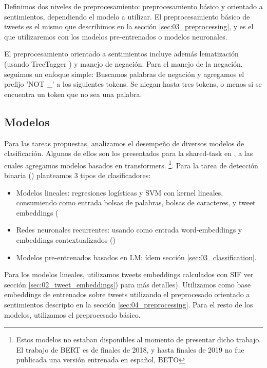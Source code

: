 Definimos dos niveles de preprocesamiento: preprocesamiento básico y orientado a sentimientos, dependiendo el modelo a utilizar. El preprocesamiento básico de tweets es el mismo que describimos en la sección \ref{sec:03_preprocessing}, y es el que utilizaremos con los modelos pre-entrenados o modelos neuronales.

El preprocesamiento orientado a sentimientos incluye además lematización (usando TreeTagger \cite{schmid95}) y manejo de negación.
Para el manejo de la negación, seguimos un enfoque simple:
Buscamos palabras de negación y agregamos el prefijo 'NOT \_' a los siguientes tokens. Se niegan hasta tres tokens, o menos si se encuentra un token que no sea una palabra.

\subsection{Modelos}

Para las tareas propuestas, analizamos el desempeño de diversos modelos de clasificación. Algunos de ellos son los presentados para la shared-task \hateval{} en \citet{atalaya_tass2018}, a las cuales agregamos modelos basados en transformers. \footnote{Estos modelos no estaban disponibles al momento de presentar dicho trabajo. El trabajo de BERT\cite{devlin2018bert} es de finales de 2018, y hasta finales de 2019 no fue publicada una versión entrenada en español, BETO}. Para la tarea de detección binaria (\subtaska{}) planteamos 3 tipos de clasificadores:

\begin{itemize}
    \item Modelos lineales: regresiones logísticas y SVM con kernel lineales, consumiendo como entrada bolsas de palabras, bolsas de caracteres, y tweet embeddings (
    \item Redes neuronales recurrentes: usando como entrada word-embeddings y embeddings contextualizados (\elmo{})
    \item Modelos pre-entrenados basados en LM: ídem sección \ref{sec:03_classification}.
\end{itemize}

Para los modelos lineales, utilizamos tweets embeddings calculados con SIF ver sección \ref{sec:02_tweet_embeddings}) para más detalles). Utilizamos como base embeddings de \fasttext{} entrenados sobre tweets utilizando el preprocesado orientado a sentimientos descripto en la sección \ref{sec:04_preprocessing}. Para el resto de los modelos, utilizamos el preprocesado básico.

